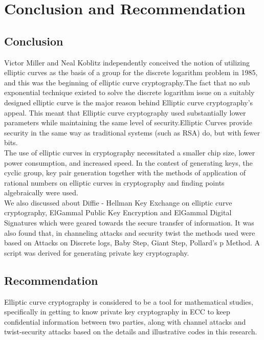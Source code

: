 \chapter{Conclusion and Recommendation}
\section{Conclusion}
Victor Miller and Neal Koblitz independently conceived the notion of utilizing elliptic curves as the basis of a group for the discrete logarithm problem in 1985, and this was the beginning of elliptic curve cryptography.The fact that no sub exponential technique existed to solve the discrete logarithm issue on a suitably designed elliptic curve is the major reason behind Elliptic curve cryptography's appeal. This meant that Elliptic curve cryptography used substantially lower parameters while maintaining the same level of security.Elliptic Curves provide security in the same way as traditional systems (such as RSA) do, but with fewer bits.\\
The use of elliptic curves in cryptography necessitated a smaller chip size, lower power consumption, and increased speed. In the contest of generating keys, the cyclic group, key pair generation together with the methods of application of rational numbers on elliptic curves in cryptography and finding points algebraically were used.\\
We also discussed about Diffie - Hellman Key Exchange on elliptic curve cryptography, ElGammal Public Key Encryption and ElGammal Digital Signatures which were geared towards the secure transfer of information. It was also found that, in channeling attacks and security twist the methods used were based on Attacks on Discrete logs, Baby Step, Giant Step, Pollard's p Method. A script was derived for generating private key cryptography.
 
 
 
\section{Recommendation}
Elliptic curve cryptography is considered to be a tool for mathematical studies, specifically in getting to know private key cryptography in ECC to keep confidential information between two parties, along with channel attacks and twist-security attacks based on the details and illustrative codes in this research.